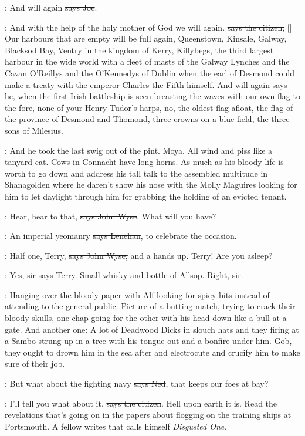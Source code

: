 \joe:
And will again \sout{says Joe}.

\citizen:
And with the help of the holy mother of God
we will again. \sout{says the
citizen,} []
Our harbours that are empty will be full
again, Queenstown, Kinsale, Galway, Blacksod Bay, Ventry in the kingdom of
Kerry, Killybegs, the third largest harbour in the wide world with a fleet
of masts of the Galway Lynches and the Cavan O'Reillys and the
O'Kennedys of Dublin when the earl of Desmond could make a treaty with
the emperor Charles the Fifth himself. And will again \sout{says he}, when the
first Irish battleship is seen breasting the waves with our own flag to
the fore, none of your Henry Tudor's harps, no, the oldest flag afloat,
the flag of the province of Desmond and Thomond, three crowns on a blue
field, the three sons of Milesius.

\Nq:
And he took the last swig out of the pint. Moya. All wind and piss like
a tanyard cat. Cows in Connacht have long horns. As much as his bloody
life is worth to go down and address his tall talk to the assembled
multitude in Shanagolden where he daren't show his nose with the Molly
Maguires looking for him to let daylight through him for grabbing the
holding of an evicted tenant.

\johnwyse:
Hear, hear to that, \sout{says John Wyse}.
What will you have?

\lenehan:
An imperial yeomanry \sout{says Lenehan},
to celebrate the occasion.

\johnwyse:
Half one, Terry, \sout{says John Wyse,}
and a hands up. Terry! Are you asleep?

\terry:
Yes, sir \sout{says Terry}.
Small whisky and bottle of Allsop. Right, sir.

\Nq:
Hanging over the bloody paper with Alf looking for spicy bits instead
of attending to the general public. Picture of a butting match, trying to
crack their bloody skulls, one chap going for the other with his head down
like a bull at a gate. And another one:
A lot of Deadwood Dicks in slouch hats and they firing at a Sambo strung
up in a tree with his tongue out and a bonfire under him. Gob, they ought
to drown him in the sea after and electrocute and crucify him to make sure
of their job.

\lambert:
But what about the fighting navy \sout{says Ned},
that keeps our foes at bay?

\citizen:
I'll tell you what about it, \sout{says the citizen}.
Hell upon earth it is.
Read the revelations that's going on in the papers about flogging on the
training ships at Portsmouth. A fellow writes that calls himself \emph{Disgusted
One}.

